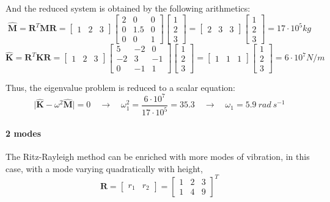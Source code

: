 And the reduced system is obtained by the following arithmetics:
$$
\hat{\mathbf{M}} = \mathbf{R}^T \mathbf{M} \mathbf{R} =
\begin{bmatrix}
    1 & 2 & 3
\end{bmatrix}
\begin{bmatrix}
    2 & 0 & 0 \\
    0 & 1.5 & 0 \\
    0 & 0 & 1
\end{bmatrix}
\begin{bmatrix}
    1 \\ 2 \\ 3
\end{bmatrix} =
\begin{bmatrix}
    2 & 3 & 3
\end{bmatrix}
\begin{bmatrix}
    1 \\ 2 \\ 3
\end{bmatrix} = 17 \cdot 10^5 kg
$$
$$
\hat{\mathbf{K}} = \mathbf{R}^T \mathbf{K} \mathbf{R} =
\begin{bmatrix}
    1 & 2 & 3
\end{bmatrix}
\begin{bmatrix}
    5 & -2 & 0 \\
    -2 & 3 & -1 \\
    0 & -1 & 1
\end{bmatrix}
\begin{bmatrix}
    1 \\ 2 \\ 3
\end{bmatrix} =
\begin{bmatrix}
    1 & 1 & 1
\end{bmatrix}
\begin{bmatrix}
    1 \\ 2 \\ 3
\end{bmatrix} = 6 \cdot 10^7 N/m
$$

Thus, the eigenvalue problem is reduced to a scalar equation:
$$
\vert \hat{\mathbf{K}} - \omega^2\hat{\mathbf{M}} \vert = 0 \quad \rightarrow \quad
\omega^2_1 = \frac{6\cdot10^7}{17\cdot10^5} = 35.3 \quad \rightarrow \quad
\omega_1 = 5.9\ rad\ s^{-1}
$$


\paragraph{2 modes} The Ritz-Rayleigh method can be enriched with more modes of vibration, in this case, with a mode varying quadratically with height,
$$
\mathbf{R} =
\begin{bmatrix}
    r_1 & r_2
\end{bmatrix} =
\begin{bmatrix}
    1 & 2 & 3 \\
    1 & 4 & 9
\end{bmatrix}^T
$$

